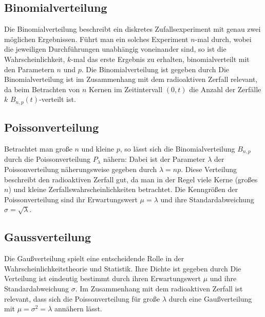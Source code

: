 \subsection{Binomialverteilung}
Die Binomialverteilung beschreibt ein diskretes Zufallsexperiment mit genau zwei möglichen Ergebnissen. Führt man ein solches Experiment $n$-mal durch, wobei die jeweiligen Durchführungen unabhängig voneinander sind, so ist die Wahrscheinlichkeit, $k$-mal das erste Ergebnis zu erhalten, binomialverteilt mit den Parametern $n$ und $p$. Die Binomialverteilung ist gegeben durch
Die Binomialverteilung ist im Zusammenhang mit dem radioaktiven Zerfall relevant, da beim Betrachten von $n$ Kernen im Zeitintervall $(0,t)$ die Anzahl der Zerfälle $k$ $B_{n,p}(t)$-verteilt ist.

\subsection{Poissonverteilung}
Betrachtet man große $n$ und kleine $p$, so lässt sich die Binomialverteilung $B_{n,p}$ durch die Poissonverteilung $P_\lambda$ nähern:
Dabei ist der Parameter $\lambda$ der Poissonverteilung näherungsweise gegeben durch $\lambda = np$. Diese Verteilung beschreibt den radioaktiven Zerfall gut, da man in der Regel viele Kerne (großes $n$) und kleine Zerfallswahrscheinlichkeiten betrachtet. Die Kenngrößen der Poissonverteilung sind ihr Erwartungswert $\mu = \lambda$ und ihre Standardabweichung $\sigma = \sqrt{\lambda}$.


\subsection{Gaussverteilung}
Die Gaußverteilung spielt eine entscheidende Rolle in der Wahrscheinlichkeitstheorie und Statistik. Ihre Dichte ist gegeben durch
Die Verteilung ist eindeutig bestimmt durch ihren Erwartungswert $\mu$ und ihre Standardabweichung $\sigma$. Im Zusammenhang mit dem radioaktiven Zerfall ist relevant, dass sich die Poissonverteilung für große $\lambda$ durch eine Gaußverteilung mit $\mu = \sigma^2 = \lambda$ annähern lässt.


